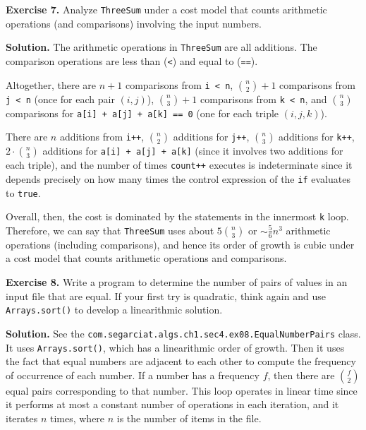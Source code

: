 \documentclass[12pt, a4paper]{article}
\newenvironment{ex}[2][Exercise]
{\par\medskip\noindent \textbf{#1 #2.}}
{\medskip}
\newenvironment{sol}[1][Solution]
{\par\medskip\noindent \textbf{#1.} }
{\medskip}
\begin{document}
	\begin{ex}{7}
		Analyze \texttt{ThreeSum} under a cost model that counts arithmetic operations (and comparisons)
		involving the input numbers.
	\end{ex}
	\begin{sol}
		The arithmetic operations in \texttt{ThreeSum} are all additions. The comparison operations
		are less than (\texttt{<}) and equal to (\texttt{==}).
		
		Altogether, there are $n + 1$ comparisons from \texttt{i < n}, $\binom{n}{2} + 1$ comparisons
		from \texttt{j < n} (once for each pair $(i, j)$), $\binom{n}{3} + 1$ comparisons from \texttt{k < n}, and
		$\binom{n}{3}$ comparisons for \texttt{a[i] + a[j] + a[k] == 0} (one for each triple $(i,j,k)$).
		
		There are $n$ additions from \texttt{i++}, $\binom{n}{2}$ additions for \texttt{j++},
		$\binom{n}{3}$ additions for \texttt{k++}, $2\cdot \binom{n}{3}$ additions for
		\texttt{a[i] + a[j] + a[k]} (since it involves two additions for each triple),
		and the number of times \texttt{count++} executes is indeterminate since it depends
		precisely on how many times the control expression of the \texttt{if} evaluates to \texttt{true}.
		
		Overall, then, the cost is dominated by the statements in the innermost \texttt{k} loop.
		Therefore, we can say that \texttt{ThreeSum} uses about $5\binom{n}{3}$ or $\sim \frac{5}{6}n^3$
		arithmetic operations (including comparisons), and hence its order of growth is cubic under
		a cost  model that counts arithmetic operations and comparisons.
	\end{sol}
	\begin{ex}{8}
		Write a program to determine the number of pairs of values in an input file that
		are equal. If your first try is quadratic, think again and use \texttt{Arrays.sort()}
		to develop a linearithmic solution.
	\end{ex}
	\begin{sol}
		See the \texttt{com.segarciat.algs.ch1.sec4.ex08.EqualNumberPairs} class. It uses
		\texttt{Arrays.sort()}, which has a linearithmic order of growth. Then it uses the
		fact that equal numbers are adjacent to each other to compute the frequency of
		occurrence of each number. If a number has a frequency $f$, then there are
		$\binom{f}{2}$ equal pairs corresponding to that number. This loop operates
		in linear time since it performs at most a constant number of operations
		in each iteration, and it iterates $n$ times, where $n$ is the number of
		items in the file.
	\end{sol}
\end{document}
